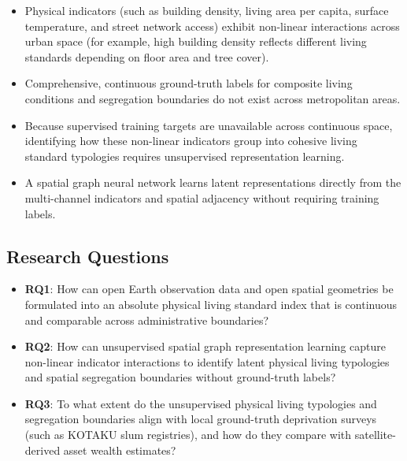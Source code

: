 \documentclass[11pt,a4paper]{article}
\begin{document}
\begin{itemize}[leftmargin=*]
    \begin{itemize}
        \item Physical indicators (such as building density, living area per capita, surface temperature, and street network access) exhibit non-linear interactions across urban space (for example, high building density reflects different living standards depending on floor area and tree cover).
        \item Comprehensive, continuous ground-truth labels for composite living conditions and segregation boundaries do not exist across metropolitan areas.
        \item Because supervised training targets are unavailable across continuous space, identifying how these non-linear indicators group into cohesive living standard typologies requires unsupervised representation learning.
        \item A spatial graph neural network learns latent representations directly from the multi-channel indicators and spatial adjacency without requiring training labels.
    \end{itemize}
\end{itemize}

\subsection{Research Questions}
\begin{itemize}[leftmargin=*]
    \item \textbf{RQ1}: How can open Earth observation data and open spatial geometries be formulated into an absolute physical living standard index that is continuous and comparable across administrative boundaries?
    \item \textbf{RQ2}: How can unsupervised spatial graph representation learning capture non-linear indicator interactions to identify latent physical living typologies and spatial segregation boundaries without ground-truth labels?
    \item \textbf{RQ3}: To what extent do the unsupervised physical living typologies and segregation boundaries align with local ground-truth deprivation surveys (such as KOTAKU slum registries), and how do they compare with satellite-derived asset wealth estimates?
\end{itemize}
\end{document}
